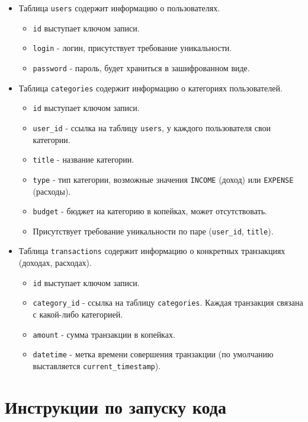 \documentclass[a4paper, 14pt]{article}
\begin{document}
\begin{itemize}
	\item Таблица \texttt{users} содержит информацию о пользователях.
	\begin{itemize}
		\item \texttt{id} выступает ключом записи.
		\item \texttt{login} - логин, присутствует требование уникальности.
		\item \texttt{password} - пароль, будет храниться в зашифрованном виде.
	\end{itemize}
	\item Таблица \texttt{categories} содержит информацию о категориях пользователей.
	\begin{itemize}
		\item \texttt{id} выступает ключом записи.
		\item \texttt{user\_id} - ссылка на таблицу \texttt{users}, у каждого пользователя свои категории.
		\item \texttt{title} - название категории.
		\item \texttt{type} - тип категории, возможные значения \texttt{INCOME} (доход) или \texttt{EXPENSE} (расходы).
		\item \texttt{budget} - бюджет на категорию в копейках, может отсутствовать.
		\item Присутствует требование уникальности по паре (\texttt{user\_id}, \texttt{title}).
	\end{itemize}
	\item Таблица \texttt{transactions} содержит информацию о конкретных транзакциях (доходах, расходах).
	\begin{itemize}
		\item \texttt{id} выступает ключом записи.
		\item \texttt{category\_id} - ссылка на таблицу \texttt{categories}. Каждая транзакция связана с какой-либо категорией.
		\item \texttt{amount} - сумма транзакции в копейках.
		\item \texttt{datetime} - метка времени совершения транзакции (по умолчанию выставляется \texttt{current\_timestamp}).
	\end{itemize}
\end{itemize}

\newpage
\section{Инструкции по запуску кода}
\end{document}
